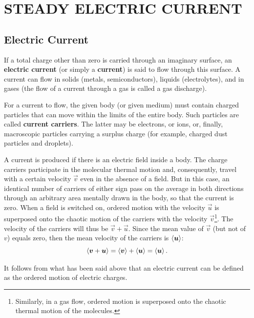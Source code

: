 

\chapter[STEADY ELECTRIC CURRENT]{STEADY ELECTRIC CURRENT}\label{chap:5}

\section{Electric Current}\label{sec:5_1}

If a total charge other than zero is carried through an imaginary surface, an \textbf{electric current} (or simply a \textbf{current}) is said to flow through this surface. A current can flow in solids (metals, semiconductors), liquids (electrolytes), and in gases (the flow of a current through a gas is called a gas discharge).

For a current to flow, the given body (or given medium) must contain charged particles that can move within the limits of the entire body. Such particles are called \textbf{current carriers}. The latter may be electrons, or ions, or, finally, macroscopic particles carrying a surplus charge (for example, charged dust particles and droplets).

A current is produced if there is an electric field inside a body. The charge carriers participate in the molecular thermal motion and, consequently, travel with a certain velocity $\vec{v}$ even in the absence of a field. But in this case, an identical number of carriers of either sign pass on the average in both directions through an arbitrary area mentally drawn in the body, so that the current is zero. When a field is switched on, ordered motion with the velocity $\vec{u}$ is superposed onto the chaotic motion of the carriers with the velocity $\vec{v}$\footnote{Similarly, in a gas flow, ordered motion is superposed onto the chaotic thermal motion of the molecules.}. The velocity of the carriers will thus be $\vec{v}+\vec{u}$. Since the mean value of $\vec{v}$ (but not of $v$) equals zero, then the mean velocity of the carriers is $\left\langle \boldsymbol{u} \right\rangle$:
\begin{equation*}
    \left\langle \boldsymbol{v}+\boldsymbol{u} \right\rangle = \left\langle \boldsymbol{v} \right\rangle + \left\langle \boldsymbol{u} \right\rangle = \left\langle \boldsymbol{u} \right\rangle.
\end{equation*}

\noindent
It follows from what has been said above that an electric current can be defined as the ordered motion of electric charges.


